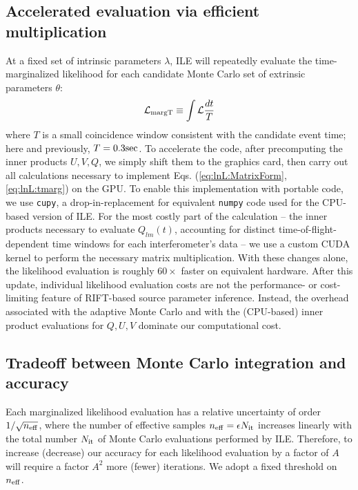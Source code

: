 \documentclass[twocolumn,prd,nofootinbib]{revtex4}
\newcommand\unit[1]{{\rm #1}}
\newcommand\ILE{ILE}
\begin{document}
\subsection{Accelerated evaluation via efficient multiplication}


At a fixed set of intrinsic parameters $\lambda$, \ILE{} will repeatedly evaluate the time-marginalized likelihood 
for each candidate Monte Carlo set of extrinsic parameters $\theta$:
\begin{eqnarray}
{\cal L}_{\rm margT} \equiv  \int {\cal L} \frac{dt}{T}
\label{eq:lnL:tmarg}
\end{eqnarray}
where $T$ is a small coincidence window consistent with the candidate event time; here and previously,
$T=0.3\unit{sec}$.   To accelerate the code, after precomputing the inner products $U,V,Q$, we simply shift them to the
graphics card, then carry out all calculations necessary to implement Eqs. (\ref{eq:lnL:MatrixForm}, \ref{eq:lnL:tmarg})
on the GPU.  To enable this implementation with portable code, we use \texttt{cupy}, a drop-in-replacement for equivalent
\texttt{numpy} code used for the CPU-based version of ILE.    For the most costly part of the calculation -- the inner
products necessary to evaluate $Q_{lm}(t)$, accounting for distinct time-of-flight-dependent time windows for each
interferometer's data -- we use a custom CUDA kernel to perform the necessary matrix multiplication.  
%
With these changes alone, the likelihood evaluation is roughly $60\times$ faster on equivalent hardware.  
After this update, individual likelihood evaluation costs are not the performance- or cost-limiting feature of RIFT-based source
parameter inference.  Instead, the overhead associated with the adaptive Monte Carlo and with the (CPU-based) inner
product evaluations for $Q,U,V$ dominate our computational cost.



\subsection{Tradeoff between Monte Carlo integration and accuracy}

Each marginalized likelihood evaluation has a relative uncertainty of order  $1/\sqrt{n_{\rm eff}}$, where the number of
effective samples $n_{\rm eff}=\epsilon N_{\rm it}$ increases linearly with the total number $N_{\rm it}$ of Monte Carlo
evaluations performed by \ILE{}.  Therefore, to increase (decrease) our accuracy for each likelihood evaluation by a factor of $A$
will require a factor $A^2$ more (fewer) iterations.   
%
We adopt a fixed threshold on $n_{\rm eff}$.  
\end{document}

